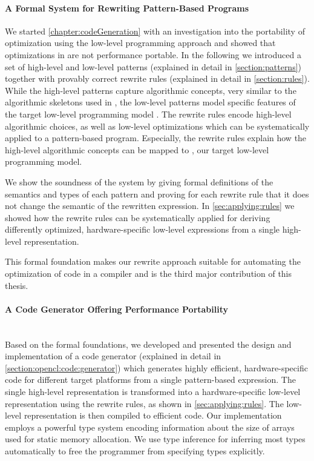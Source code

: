 \paragraph{A Formal System for Rewriting Pattern-Based Programs}
We started \autoref{chapter:codeGeneration} with an investigation into the portability of optimization using the low-level programming approach \OpenCL and showed that optimizations in \OpenCL are not performance portable.
In the following we introduced a set of high-level and low-level patterns (explained in detail in \autoref{section:patterns}) together with provably correct rewrite rules (explained in detail in \autoref{section:rules}).
While the high-level patterns capture algorithmic concepts, very similar to the algorithmic skeletons used in \SkelCL, the low-level patterns model specific features of the target low-level programming model \OpenCL.
The rewrite rules encode high-level algorithmic choices, as well as low-level optimizations which can be systematically applied to a pattern-based program.
Especially, the rewrite rules explain how the high-level algorithmic concepts can be mapped to \OpenCL, our target low-level programming model.

We show the soundness of the system by giving formal definitions of the semantics and types of each pattern and proving for each rewrite rule that it does not change the semantic of the rewritten expression.
In \autoref{sec:applying:rules} we showed how the rewrite rules can be systematically applied for deriving differently optimized, hardware-specific low-level expressions from a single high-level representation.

\bigskip
This formal foundation makes our rewrite approach suitable for automating the optimization of code in a compiler and is the third major contribution of this thesis.

\paragraph{A Code Generator Offering Performance Portability}\hfill\\
Based on the formal foundations, we developed and presented the design and implementation of a code generator (explained in detail in \autoref{section:opencl:code:generator}) which generates highly efficient, hardware-specific \OpenCL code for different target platforms from a single pattern-based expression.
The single high-level representation is transformed into a hardware-specific low-level representation using the rewrite rules, as shown in \autoref{sec:applying:rules}.
The low-level representation is then compiled to efficient \OpenCL code.
Our implementation employs a powerful type system encoding information about the size of arrays used for static memory allocation.
We use type inference for inferring most types automatically to free the programmer from specifying types explicitly.

